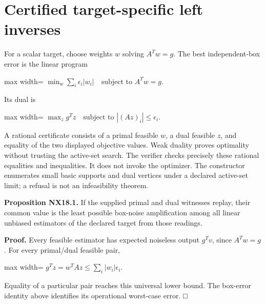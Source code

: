\documentclass[
  11pt,
  a4paper,
]{report}
\begin{document}
\hypertarget{certified-target-specific-left-inverses}{%
\section{Certified target-specific left
inverses}\label{certified-target-specific-left-inverses}}

For a scalar target, choose weights \(w\) solving \(A^Tw=g\). The best
independent-box error is the linear program

\begin{center}
\begin{adjustbox}{max width=\linewidth}
$\displaystyle
 \min_w\sum_i\epsilon_i|w_i|\quad\text{subject to }A^Tw=g.
$
\end{adjustbox}
\end{center}

Its dual is

\begin{center}
\begin{adjustbox}{max width=\linewidth}
$\displaystyle
 \max_z g^Tz\quad\text{subject to }|(Az)_i|\le\epsilon_i.
$
\end{adjustbox}
\end{center}

A rational certificate consists of a primal feasible \(w\), a dual
feasible \(z\), and equality of the two displayed objective values. Weak
duality proves optimality without trusting the active-set search. The
verifier checks precisely these rational equalities and inequalities. It
does not invoke the optimizer. The constructor enumerates small basic
supports and dual vertices under a declared active-set limit; a refusal
is not an infeasibility theorem.

\textbf{Proposition NX18.1.} If the supplied primal and dual witnesses
replay, their common value is the least possible box-noise amplification
among all linear unbiased estimators of the declared target from those
readings.

\textbf{Proof.} Every feasible estimator has expected noiseless output
\(g^Tv\), since \(A^Tw=g\). For every primal/dual feasible pair,

\begin{center}
\begin{adjustbox}{max width=\linewidth}
$\displaystyle
 g^Tz=w^TAz\le\sum_i|w_i|\epsilon_i.
$
\end{adjustbox}
\end{center}

Equality of a particular pair reaches this universal lower bound. The
box-error identity above identifies its operational worst-case error. □
\end{document}
